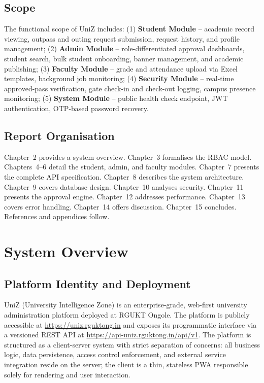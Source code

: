 \documentclass[12pt,a4paper]{report}
\begin{document}
\section{Scope}

The functional scope of UniZ includes: (1) \textbf{Student Module} -- academic record viewing, outpass and outing request submission, request history, and profile management; (2) \textbf{Admin Module} -- role-differentiated approval dashboards, student search, bulk student onboarding, banner management, and academic publishing; (3) \textbf{Faculty Module} -- grade and attendance upload via Excel templates, background job monitoring; (4) \textbf{Security Module} -- real-time approved-pass verification, gate check-in and check-out logging, campus presence monitoring; (5) \textbf{System Module} -- public health check endpoint, JWT authentication, OTP-based password recovery.

\section{Report Organisation}

Chapter~2 provides a system overview. Chapter~3 formalises the RBAC model. Chapters~4--6 detail the student, admin, and faculty modules. Chapter~7 presents the complete API specification. Chapter~8 describes the system architecture. Chapter~9 covers database design. Chapter~10 analyses security. Chapter~11 presents the approval engine. Chapter~12 addresses performance. Chapter~13 covers error handling. Chapter~14 offers discussion. Chapter~15 concludes. References and appendices follow.

\chapter{System Overview}

\section{Platform Identity and Deployment}

UniZ (University Intelligence Zone) is an enterprise-grade, web-first university administration platform deployed at RGUKT Ongole. The platform is publicly accessible at \url{https://uniz.rguktong.in} and exposes its programmatic interface via a versioned REST API at \url{https://api-uniz.rguktong.in/api/v1}. The platform is structured as a client-server system with strict separation of concerns: all business logic, data persistence, access control enforcement, and external service integration reside on the server; the client is a thin, stateless PWA responsible solely for rendering and user interaction.
\end{document}
